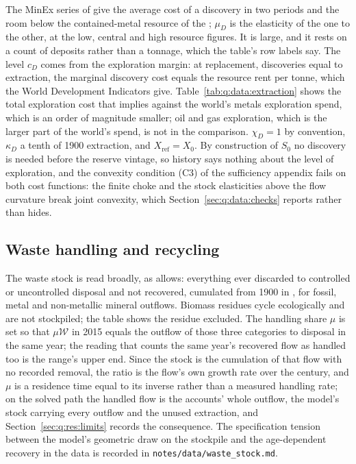  The MinEx series of \textcite{schodde2023} give the average cost of a discovery in two periods and the room below the contained-metal resource of the \textcite{usgs2026mcs}; $\mu_D$ is the elasticity of the one to the other, at the low, central and high resource figures. It is large, and it rests on a count of deposits rather than a tonnage, which the table's row labels say. The level $c_D$ comes from the exploration margin: at replacement, discoveries equal to extraction, the marginal discovery cost equals the resource rent per tonne, which the World Development Indicators give. Table~\ref{tab:q:data:extraction} shows the total exploration cost that implies against the world's metals exploration spend, which is an order of magnitude smaller; oil and gas exploration, which is the larger part of the world's spend, is not in the comparison. $\chi_D=1$ by convention, $\kappa_D$ a tenth of 1900 extraction, and $X_{\mathrm{ref}}=X_0$. By construction of $S_0$ no discovery is needed before the reserve vintage, so history says nothing about the level of exploration, and the convexity condition (C3) of the sufficiency appendix fails on both cost functions: the finite choke and the stock elasticities above the flow curvature break joint convexity, which Section~\ref{sec:q:data:checks} reports rather than hides.



\subsection{Waste handling and recycling}\label{sec:q:data:waste}

 The waste stock is read broadly, as  allows: everything ever discarded to controlled or uncontrolled disposal and not recovered, cumulated from 1900 in \textcite{haas2020}, for fossil, metal and non-metallic mineral outflows. Biomass residues cycle ecologically and are not stockpiled; the table shows the residue excluded. The handling share $\mu$ is set so that $\mu\mathcal W$ in 2015 equals the outflow of those three categories to disposal in the same year; the reading that counts the same year's recovered flow as handled too is the range's upper end. Since the stock is the cumulation of that flow with no recorded removal, the ratio is the flow's own growth rate over the century, and $\mu$ is a residence time equal to its inverse rather than a measured handling rate; on the solved path the handled flow is the accounts' whole outflow, the model's stock carrying every outflow and the unused extraction, and Section~\ref{sec:q:res:limits} records the consequence. The specification tension between the model's geometric draw on the stockpile and the age-dependent recovery in the data is recorded in \texttt{notes/data/waste\_stock.md}.

